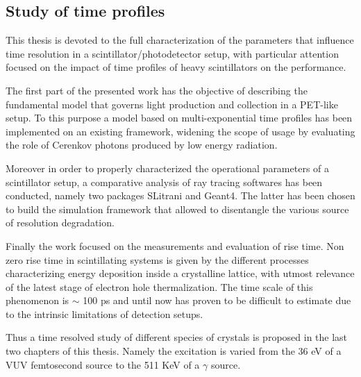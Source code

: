 
\subsection{Study of time profiles}

This thesis is devoted to the full characterization of the parameters that influence time resolution in a scintillator/photodetector setup, with particular attention focused on the impact of time profiles of heavy scintillators on the performance.

The first part of the presented work has the objective of describing the fundamental model that governs light production and collection in a PET-like setup.
To this purpose a model based on multi-exponential time profiles has been implemented on an existing framework, widening the scope of usage by evaluating the role of Cerenkov photons produced by low energy radiation.

Moreover in order to properly characterized the operational parameters of a scintillator setup, a comparative analysis of ray tracing softwares has been conducted, namely two packages SLitrani and Geant4. The latter has been chosen to build the simulation framework that allowed to disentangle the various source of resolution degradation.

Finally the work focused on the measurements and evaluation of rise time. Non zero rise time in scintillating systems is given by the different processes characterizing energy deposition inside a crystalline lattice, with utmost relevance of the latest stage of electron hole thermalization. The time scale of this phenomenon is $\sim$ 100 ps and until now has proven to be difficult to estimate due to the intrinsic limitations of detection setups.

Thus a time resolved study of different species of crystals is proposed in the last two chapters of this thesis. Namely the excitation is varied from the 36 eV of a VUV femtosecond source to the 511 KeV of a $\gamma$ source. 



